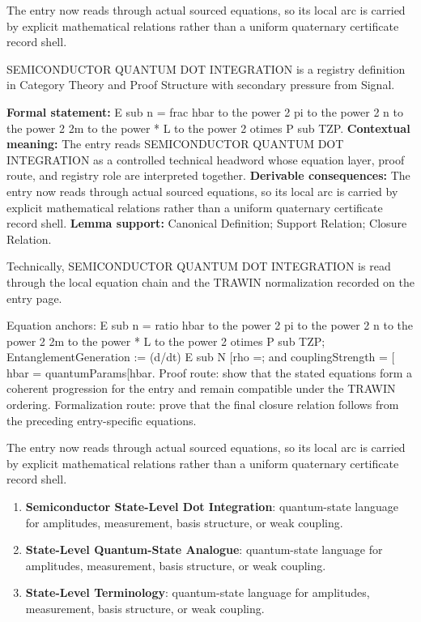 The entry now reads through actual sourced equations, so its local arc is carried by explicit mathematical relations rather than a uniform quaternary certificate record shell.
\clearpage


\begingroup\small
{}
SEMICONDUCTOR QUANTUM DOT INTEGRATION is a registry definition in Category Theory and Proof Structure with secondary pressure from Signal.

\begingroup\footnotesize\setlength{\emergencystretch}{3em}\sloppy
\textbf{Formal statement:} E sub n = frac hbar to the power 2 pi to the power 2 n to the power 2 2m to the power * L to the power 2 otimes P sub TZP. \textbf{Contextual meaning:} The entry reads SEMICONDUCTOR QUANTUM DOT INTEGRATION as a controlled technical headword whose equation layer, proof route, and registry role are interpreted together. \textbf{Derivable consequences:} The entry now reads through actual sourced equations, so its local arc is carried by explicit mathematical relations rather than a uniform quaternary certificate record shell. \textbf{Lemma support:} Canonical Definition; Support Relation; Closure Relation.\par
\endgroup

Technically, SEMICONDUCTOR QUANTUM DOT INTEGRATION is read through the local equation chain and the TRAWIN normalization recorded on the entry page.

Equation anchors: E sub n = ratio hbar to the power 2 pi to the power 2 n to the power 2 2m to the power * L to the power 2 otimes P sub TZP; EntanglementGeneration := (d/dt) E sub N [rho =; and couplingStrength = [ hbar = quantumParams[hbar. Proof route: show that the stated equations form a coherent progression for the entry and remain compatible under the TRAWIN ordering. Formalization route: prove that the final closure relation follows from the preceding entry-specific equations.

The entry now reads through actual sourced equations, so its local arc is carried by explicit mathematical relations rather than a uniform quaternary certificate record shell.
\endgroup

\begin{enumerate}[leftmargin=1.6em,itemsep=6pt,topsep=4pt]
\item \textbf{Semiconductor State-Level Dot Integration}: quantum-state language for amplitudes, measurement, basis structure, or weak coupling.
\item \textbf{State-Level Quantum-State Analogue}: quantum-state language for amplitudes, measurement, basis structure, or weak coupling.
\item \textbf{State-Level Terminology}: quantum-state language for amplitudes, measurement, basis structure, or weak coupling.
\end{enumerate}

